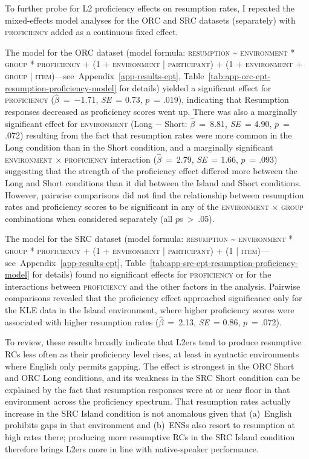 To further probe for L2 proficiency effects on resumption rates, I repeated the mixed-effects model analyses for the ORC and SRC datasets (separately) with \textsc{proficiency} added as a continuous fixed effect. 

The model for the ORC dataset (model formula: \textsc{resumption \~{} environment * group * proficiency + (1 + environment | participant) + (1 + environment + group | item)}---see~Appendix~\ref{app-results-ept}, Table~\ref{tab:app-orc-ept-resumption-proficiency-model} for details) yielded a significant effect for \textsc{proficiency} ($\hat{\beta}$~=~−1.71, \textit{SE}~= 0.73, $p$~= .019), indicating that Resumption responses decreased as proficiency scores went up. There was also a marginally significant effect for \textsc{environment} (Long − Short: $\hat{\beta}$~=~8.81, \textit{SE}~= 4.90, $p$~= .072) resulting from the fact that resumption rates were more common in the Long condition than in the Short condition, and a marginally significant \textsc{environment × proficiency} interaction ($\hat{\beta}$~=~2.79, \textit{SE}~= 1.66, $p$~= .093) suggesting that the strength of the proficiency effect differed more between the Long and Short conditions than it did between the Island and Short conditions. However, pairwise comparisons did not find the relationship between resumption rates and proficiency scores to be significant in any of the \textsc{environment × group} combinations when considered separately (all $p$s~>~.05).

The model for the SRC dataset (model formula: \textsc{resumption \~{} environment * group * proficiency + (1 + environment | participant) + (1 | item)}---see~Appendix~\ref{app-results-ept}, Table~\ref{tab:app-src-ept-resumption-proficiency-model} for details) found no significant effects for \textsc{proficiency} or for the interactions between \textsc{proficiency} and the other factors in the analysis. Pairwise comparisons revealed that the proficiency effect approached significance only for the KLE data in the Island environment, where higher proficiency scores were associated with higher resumption rates ($\hat{\beta}$~=~2.13, \textit{SE}~= 0.86, $p$~= .072).

To review, these results broadly indicate that L2ers tend to produce resumptive RCs less often as their proficiency level rises, at least in syntactic environments where English only permits gapping. The effect is strongest in the ORC Short and ORC Long conditions, and its weakness in the SRC Short condition can be explained by the fact that resumption responses were at or near floor in that environment across the proficiency spectrum. That resumption rates actually increase in the SRC Island condition is not anomalous given that (a)~English prohibits gaps in that environment and (b)~ENSs also resort to resumption at high rates there; producing more resumptive RCs in the SRC Island condition therefore brings L2ers more in line with native-speaker performance.

